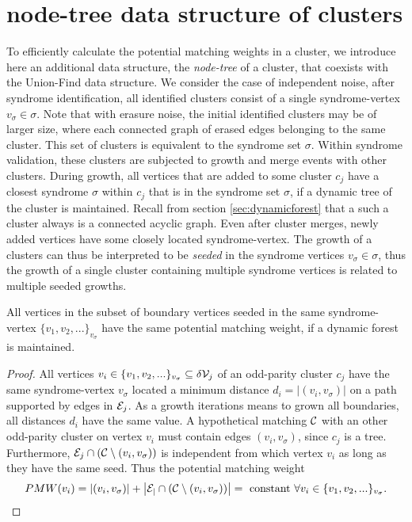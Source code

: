 \section{node-tree data structure of clusters}\label{sec:nodeset}

To efficiently calculate the potential matching weights in a cluster, we introduce here an additional data structure, the \emph{node-tree} of a cluster, that coexists with the Union-Find data structure. We consider the case of independent noise, after syndrome identification, all identified clusters consist of a single syndrome-vertex $v_\sigma \in \sigma$. Note that with erasure noise, the initial identified clusters may be of larger size, where each connected graph of erased edges belonging to the same cluster. This set of clusters is equivalent to the syndrome set $\sigma$. Within syndrome validation, these clusters are subjected to growth and merge events with other clusters. During growth, all vertices that are added to some cluster $c_j$ have a closest syndrome $\sigma$ within $c_j$ that is in the syndrome set $\sigma$, if a dynamic tree of the cluster is maintained. Recall from section \ref{sec:dynamicforest} that a such a cluster always is a connected acyclic graph. Even after cluster merges, newly added vertices have some closely located syndrome-vertex. The growth of a clusters can thus be interpreted to be \emph{seeded} in the syndrome vertices $v_\sigma \in \sigma$, thus the growth of a single cluster containing multiple syndrome vertices is related to multiple seeded growths. 

\begin{theorem}\label{the:nodepmw}
  All vertices in the subset of boundary vertices seeded in the same syndrome-vertex $ \{v_1, v_2,...\}_{v_\sigma}$ have the same potential matching weight, if a dynamic forest is maintained. 
\end{theorem}
\begin{proof}
  All vertices $v_i \in \{v_1, v_2,...\}_{v_\sigma} \subseteq \delta\mathcal{V}_j$ of an odd-parity cluster $c_j$ have the same syndrome-vertex $v_\sigma$ located a minimum distance $d_i = |(v_i, v_\sigma)|$ on a path supported by edges in $\mathcal{E}_j$. As a growth iterations means to grown all boundaries, all distances $d_i$ have the same value. A hypothetical matching $\mathcal{C}$ with an other odd-parity cluster on vertex $v_i$ must contain edges $(v_i, v_\sigma)$, since $c_j$ is a tree. Furthermore, $\mathcal{E}_j\cap (\mathcal{C} \setminus (v_i, v_\sigma))$ is independent from which vertex $v_i$ as long as they have the same seed. Thus the potential matching weight
  \begin{equation}
    PMW(v_i) = \abs{(v_i, v_\sigma)} + \abs{\mathcal{E_j}\cap (\mathcal{C} \setminus (v_i, v_\sigma))} = \text{ constant } \forall v_i \in \{v_1, v_2,...\}_{v_\sigma}. 
  \end{equation}
\end{proof}

